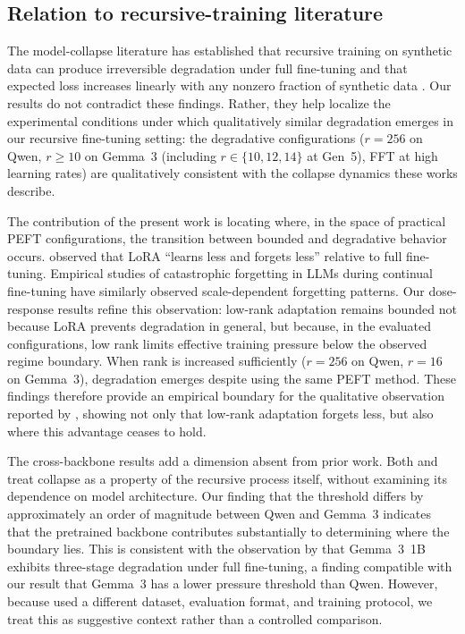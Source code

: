 \documentclass[a4paper,fleqn]{cas-dc}
\newif\ifshowchanges
\newcommand{\rev}[1]{\ifshowchanges{\color{blue}#1}\else{#1}\fi}
\begin{document}
\subsection{Relation to recursive-training literature}\label{sec:disc_literature}

The model-collapse literature has established that recursive training on
synthetic data can produce irreversible degradation under full fine-tuning
\citep{shumailov2024} and that expected loss increases linearly with any
nonzero fraction of synthetic data \citep{dohmatob2025}. Our results do not
contradict these findings. Rather, they help localize the experimental
conditions under which qualitatively similar degradation emerges in our
recursive fine-tuning setting: the degradative configurations ($r=256$ on Qwen,
\rev{$r \geq 10$ on Gemma~3 (including $r \in \{10,12,14\}$ at Gen~5)}, FFT at high learning rates) are qualitatively
consistent with the collapse dynamics these works describe.

The contribution of the present work is locating where, in the space of
practical PEFT configurations, the transition between bounded and degradative
behavior occurs. \citet{biderman2024} observed that LoRA ``learns less and
forgets less'' relative to full fine-tuning. Empirical studies of catastrophic
forgetting in LLMs during continual fine-tuning \citep{luo2023empirical} have
similarly observed scale-dependent forgetting patterns. Our dose-response results
refine
this observation: low-rank adaptation remains bounded not because LoRA prevents
degradation in general, but because, in the evaluated configurations, low rank
limits effective training pressure below the observed regime boundary. When rank
is increased sufficiently ($r=256$ on Qwen, $r=16$ on Gemma~3), degradation
emerges despite using the same PEFT method. These findings therefore
provide an empirical boundary for the qualitative observation reported by
\citet{biderman2024}, showing not only that low-rank adaptation forgets less,
but also where this advantage ceases to hold.

The cross-backbone results add a dimension absent from prior work. Both
\citet{shumailov2024} and \citet{dohmatob2025} treat collapse as a property of
the recursive process itself, without examining its dependence on model
architecture. Our finding that the threshold differs by approximately an order
of magnitude between Qwen and Gemma~3 indicates that the pretrained backbone
contributes substantially to determining where the boundary lies. This
is consistent with the observation by \citet{keisha2025} that Gemma~3~1B
exhibits three-stage degradation under full fine-tuning, a finding compatible
with our result that Gemma~3 has a lower pressure threshold than Qwen. However,
because \citet{keisha2025} used a different dataset, evaluation format, and
training protocol, we treat this as suggestive context rather than a controlled
comparison.
\end{document}
